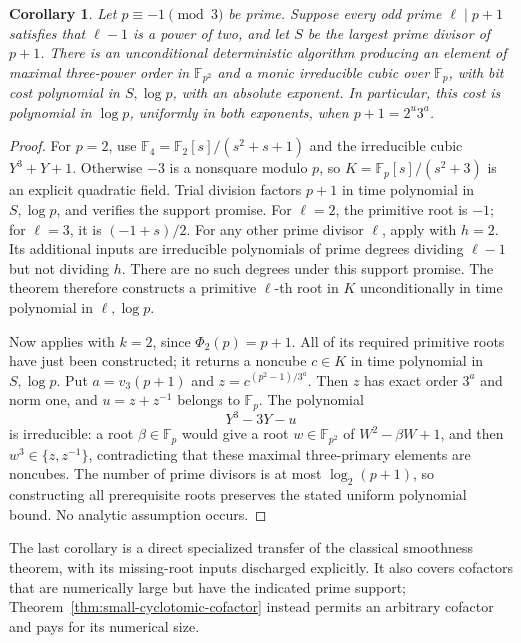 \documentclass[11pt]{article}
\newtheorem{corollary}[theorem]{Corollary}
\theoremstyle{definition}
\theoremstyle{remark}
\begin{document}
\begin{corollary}\label{cor:fermat-supported-cubic}
Let \(p\equiv-1\pmod3\) be prime. Suppose every odd prime
\(\ell\mid p+1\) satisfies that \(\ell-1\) is a power of
two, and let \(S\) be the largest prime divisor of \(p+1\).
There is an unconditional deterministic algorithm producing
an element of maximal three-power order in \(\mathbb F_{p^2}\)
and a monic irreducible cubic over \(\mathbb F_p\), with bit
cost polynomial in \(S,\log p\), with an absolute exponent.
In particular, this cost is polynomial in \(\log p\),
uniformly in both exponents, when \(p+1=2^u3^a\).
\end{corollary}
\begin{proof}
For \(p=2\), use \(\mathbb F_4=\mathbb F_2[s]/(s^2+s+1)\)
and the irreducible cubic \(Y^3+Y+1\). Otherwise
\(-3\) is a nonsquare modulo \(p\), so
\(K=\mathbb F_p[s]/(s^2+3)\) is an explicit quadratic field.
Trial division factors \(p+1\) in time polynomial in
\(S,\log p\), and verifies the support promise.
For \(\ell=2\), the primitive root is \(-1\); for
\(\ell=3\), it is \((-1+s)/2\).
For any other prime divisor \(\ell\), apply
\citet[Theorem~2, author p.~3; proof, pp.~13--16]{BGL2001}
with \(h=2\). Its additional inputs are irreducible
polynomials of prime degrees dividing \(\ell-1\) but not
dividing \(h\). There are no such degrees under this
support promise. The theorem therefore constructs a primitive
\(\ell\)-th root in \(K\) unconditionally in time polynomial
in \(\ell,\log p\).

Now \citet[Theorem~3, author p.~3; proof, pp.~17--20]{BGL2001}
applies with \(k=2\), since \(\Phi_2(p)=p+1\). All of its
required primitive roots have just been constructed; it
returns a noncube \(c\in K\) in time polynomial in
\(S,\log p\). Put \(a=v_3(p+1)\) and
\(z=c^{(p^2-1)/3^a}\). Then \(z\) has exact order \(3^a\)
and norm one, and \(u=z+z^{-1}\) belongs to \(\mathbb F_p\).
The polynomial
\[
                         Y^3-3Y-u
\]
is irreducible: a root \(\beta\in\mathbb F_p\) would give
a root \(w\in\mathbb F_{p^2}\) of
\(W^2-\beta W+1\), and then \(w^3\in\{z,z^{-1}\}\),
contradicting that these maximal three-primary elements are
noncubes. The number of prime divisors is at most \(\log_2(p+1)\),
so constructing all prerequisite roots preserves the stated
uniform polynomial bound. No analytic assumption occurs.
\end{proof}

The last corollary is a direct specialized transfer of the
classical smoothness theorem, with its missing-root inputs
discharged explicitly. It also covers cofactors that are
numerically large but have the indicated prime support;
Theorem~\ref{thm:small-cyclotomic-cofactor} instead permits
an arbitrary cofactor and pays for its numerical size.
\end{document}
